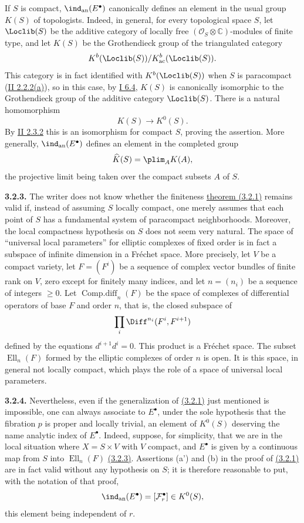 If $S$ is compact, $\ind_{\mathrm{an}}(E^\bullet)$ canonically defines an element in the usual group $K(S)$ of topologists. Indeed, in general, for every topological space $S$, let $\Loclib(S)$ be the additive category of locally free $(\mathcal O_S\otimes\mathbb C)$-modules of finite type, and let $K(S)$ be the Grothendieck group of the triangulated category
\[
 K^b(\Loclib(S))/K^b_{\mathrm{ac}}(\Loclib(S)).
\]
This category is in fact identified with $K^b(\Loclib(S))$ when $S$ is paracompact (\hyperlink{sga6.e02.prop.2-2-2}{II 2.2.2(a)}), so in this case, by \hyperlink{sga6.e01.lem.6-4}{I 6.4}, $K(S)$ is canonically isomorphic to the Grothendieck group of the additive category $\Loclib(S)$. There is a natural homomorphism
\[
 K(S)\longrightarrow K^0(S).
\]
By \hyperlink{sga6.e02.prop.2-3-2}{II 2.3.2} this is an isomorphism for compact $S$, proving the assertion. More generally, $\ind_{\mathrm{an}}(E^\bullet)$ defines an element in the completed group
\[
 \widehat K(S)=\plim_A K(A),
\]
the projective limit being taken over the compact subsets $A$ of $S$.

\textbf{3.2.3.} The writer does not know whether the finiteness \hyperlink{sga6.e02.thm.3-2-1}{theorem (3.2.1)} remains valid if, instead of assuming $S$ locally compact, one merely assumes that each point of $S$ has a fundamental system of paracompact neighborhoods. Moreover, the local compactness hypothesis on $S$ does not seem very natural. The space of ``universal local parameters'' for elliptic complexes of fixed order is in fact a subspace of infinite dimension in a Fréchet space. More precisely, let $V$ be a compact variety, let $F=(F^i)$ be a sequence of complex vector bundles of finite rank on $V$, zero except for finitely many indices, and let $n=(n_i)$ be a sequence of integers $\ge0$. Let $\operatorname{Comp.diff}_n(F)$ be the space of complexes of differential operators of base $F$ and order $n$, that is, the closed subspace of
\[
 \prod_i \Diff^{n_i}(F^i,F^{i+1})
\]
defined by the equations $d^{i+1}d^i=0$. This product is a Fréchet space. The subset $\operatorname{Ell}_n(F)$ formed by the elliptic complexes of order $n$ is open. It is this space, in general not locally compact, which plays the role of a space of universal local parameters.

\textbf{3.2.4.} Nevertheless, even if the generalization of \hyperlink{sga6.e02.thm.3-2-1}{(3.2.1)} just mentioned is impossible, one can always associate to $E^\bullet$, under the sole hypothesis that the fibration $p$ is proper and locally trivial, an element of $K^0(S)$ deserving the name analytic index of $E^\bullet$. Indeed, suppose, for simplicity, that we are in the local situation where $X=S\times V$ with $V$ compact, and $E^\bullet$ is given by a continuous map from $S$ into $\operatorname{Ell}_n(F)$ \hyperlink{sga6.e02.para.3-2-3}{(3.2.3)}. Assertions (a') and (b) in the proof of \hyperlink{sga6.e02.thm.3-2-1}{(3.2.1)} are in fact valid without any hypothesis on $S$; it is therefore reasonable to put, with the notation of that proof,
\[
 \ind_{\mathrm{an}}(E^\bullet)=[\mathcal F_r^\bullet]\in K^0(S),
\]
this element being independent of $r$.

